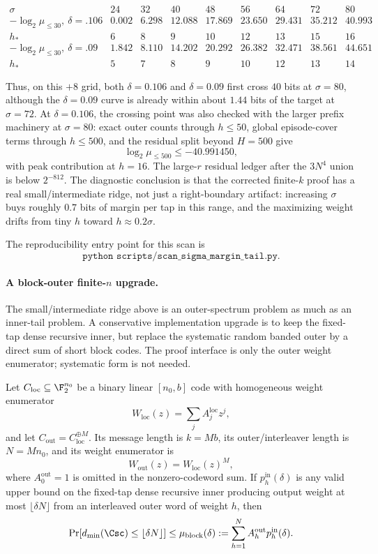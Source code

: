 \[
\begin{array}{c|rrrrrrrr}
\sigma & 24 & 32 & 40 & 48 & 56 & 64 & 72 & 80\\
\hline
-\log_2\mu_{\le30},\ \delta=.106
&0.002&6.298&12.088&17.869&23.650&29.431&35.212&40.993\\
h_*
&6&8&9&10&12&13&15&16\\
\hline
-\log_2\mu_{\le30},\ \delta=.09
&1.842&8.110&14.202&20.292&26.382&32.471&38.561&44.651\\
h_*
&5&7&8&9&10&12&13&14
\end{array}
\]

Thus, on this \(+8\) grid, both \(\delta=0.106\) and \(\delta=0.09\) first cross \(40\) bits at \(\sigma=80\), although
the \(\delta=0.09\) curve is already within about \(1.44\) bits of the target at \(\sigma=72\).  At \(\delta=0.106\),
the crossing point was also checked with the larger prefix machinery at \(\sigma=80\): exact outer counts through
\(h\le50\), global episode-cover terms through \(h\le500\), and the residual split beyond \(H=500\) give
\[
\log_2\mu_{\le500}\le -40.991450,
\]
with peak contribution at \(h=16\).  The large-\(r\) residual ledger after the \(3N^4\) union is below \(2^{-812}\).
The diagnostic conclusion is that the corrected finite-\(k\) proof has a real small/intermediate ridge, not just a
right-boundary artifact: increasing \(\sigma\) buys roughly \(0.7\) bits of margin per tap in this range, and the
maximizing weight drifts from tiny \(h\) toward \(h\approx 0.2\sigma\).

The reproducibility entry point for this scan is
\[
\texttt{python scripts/scan\_sigma\_margin\_tail.py}.
\]

\paragraph{A block-outer finite-\(n\) upgrade.}
The small/intermediate ridge above is an outer-spectrum problem as much as an inner-tail problem.  A conservative
implementation upgrade is to keep the fixed-tap dense recursive inner, but replace the systematic random banded outer
by a direct sum of short block codes.  The proof interface is only the outer weight enumerator; systematic form is not
needed.

\begin{lemma}
\label{lem:block-outer-first-moment-interface}
Let \(C_{\mathrm{loc}}\subseteq\F_2^{n_0}\) be a binary linear \([n_0,b]\) code with homogeneous weight enumerator
\[
W_{\mathrm{loc}}(z)=\sum_j A^{\mathrm{loc}}_j z^j,
\]
and let \(C_{\mathrm{out}}=C_{\mathrm{loc}}^{\oplus M}\).  Its message length is \(k=Mb\), its
outer/interleaver length is \(N=Mn_0\), and its weight enumerator is
\[
W_{\mathrm{out}}(z)=W_{\mathrm{loc}}(z)^M,
\]
where \(A_0^{\mathrm{out}}=1\) is omitted in the nonzero-codeword sum.  If \(p_h^{\mathrm{in}}(\delta)\) is any valid
upper bound on the fixed-tap dense recursive inner producing output weight at most \(\lfloor\delta N\rfloor\) from an
interleaved outer word of weight \(h\), then
\[
\Pr[d_{\min}(\Csc)\le \lfloor\delta N\rfloor]
\le
\mu_{\mathrm{block}}(\delta)
:=
\sum_{h=1}^{N} A_h^{\mathrm{out}}p_h^{\mathrm{in}}(\delta).
\]
\end{lemma}

